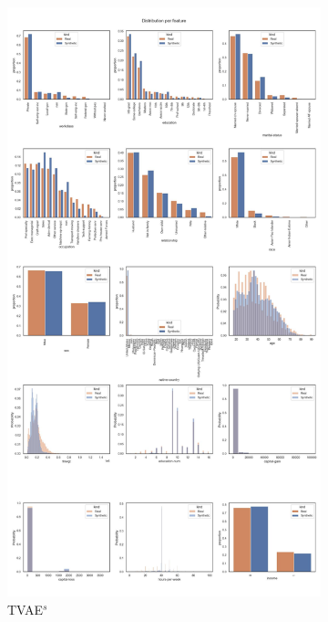 \begin{landscape}
\begin{figure}[h]
		\hfill
		\begin{subfigure}{0.3\linewidth}
			\includegraphics[height=\textheight,width=\linewidth,keepaspectratio]{images/distributions_full/tvae_simTune.jpg}
			\caption{TVAE$^s$}
		\end{subfigure}
		\hfill
		\begin{subfigure}{0.3\linewidth}

\end{subfigure}
\end{figure}
\end{landscape}
